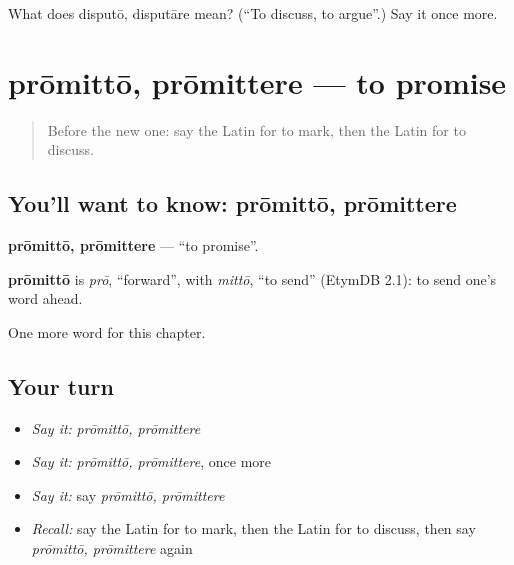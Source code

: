\begin{tcolorbox}[breakable,colback=teal!4,colframe=teal!35!black,title={Before you move on}]
What does disputō, disputāre mean? (\textquotedblleft{}To discuss, to argue\textquotedblright{}.) Say it once more.
\end{tcolorbox}
\section[prōmittō, prōmittere]{prōmittō, prōmittere — to promise}

\label{lesson:LA-C166-promitto}



\begin{quote}
Before the new one: say the Latin for to mark, then the Latin for to discuss.
\end{quote}

\subsection*{You'll want to know: prōmittō, prōmittere}
\textbf{prōmittō, prōmittere} — \textquotedblleft{}to promise\textquotedblright{}.

\begin{cousinweb}
\textbf{prōmittō} is \emph{prō}, \textquotedblleft{}forward\textquotedblright{}, with \emph{mittō}, \textquotedblleft{}to send\textquotedblright{} (EtymDB 2.1): to send one's word ahead.
\end{cousinweb}

\begin{grammarlens}[title={What you've built}]
One more word for this chapter.
\end{grammarlens}

\subsection*{Your turn}
\begin{itemize}
\raggedright
  \item \emph{Say it:} \emph{prōmittō, prōmittere}
  \item \emph{Say it:} \emph{prōmittō, prōmittere}, once more
  \item \emph{Say it:} say \emph{prōmittō, prōmittere}
  \item \emph{Recall:} say the Latin for to mark, then the Latin for to discuss, then say \emph{prōmittō, prōmittere} again
\end{itemize}

